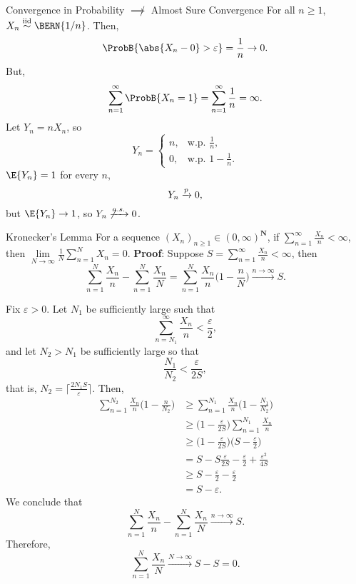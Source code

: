 \begin{Example}{Convergence in Probability $\not\implies$ Almost Sure Convergence}{}
    For all $ n\ge 1 $, $ X_n\iid \BERN{1/n} $.
    Then,
    \[ \ProbB{\abs{X_n-0}>\varepsilon}=\frac{1}{n}\to 0. \]
    But,
    \[ \sum_{n=1}^{\infty}\ProbB{X_n=1}=\sum_{n=1}^{\infty}\frac{1}{n}=\infty. \]
    Let $ Y_n=n X_n $, so
    \[ Y_n=\begin{cases}
            n, & \text{w.p. }\frac{1}{n},   \\
            0, & \text{w.p. }1-\frac{1}{n}.
        \end{cases} \]
    $ \E{Y_n}=1 $ for every $ n $,
    \[ Y_n\xrightarrow[]{p} 0, \]
    but $ \E{Y_n}\to 1 $, so $ Y_n\not\xrightarrow[]{a.s.} 0 $.
\end{Example}
\begin{Lemma}{Kronecker's Lemma}{}
    For a sequence $ (X_n)_{n\ge 1}\in (0,\infty)^{\mathbf{N}} $,
    if
    $ \sum_{n=1}^{\infty}\frac{X_n}{n}<\infty $,
    then
    $ \lim\limits_{{N} \to {\infty}}\frac{1}{N}\sum_{n=1}^{N}X_n=0 $.
    \tcblower{}
    \textbf{Proof}: Suppose
    $ S=\sum_{n=1}^{\infty}\frac{X_n}{n}<\infty $, then
    \[ \sum_{n=1}^{N}\frac{X_n}{n}-\sum_{n=1}^{N}\frac{X_n}{N}
        =\sum_{n=1}^{N}\frac{X_n}{n}\biggl(1-\frac{n}{N}\biggr)\xrightarrow[]{n\to\infty}S. \]

    Fix $ \varepsilon>0 $. Let $ N_1 $ be sufficiently large such that
    \[ \sum_{n=N_1}^{\infty}\frac{X_n}{n}<\frac{\varepsilon}{2}, \]
    and let $ N_2>N_1 $ be sufficiently large so that
    \[ \frac{N_1}{N_2}<\frac{\varepsilon}{2S}, \]
    that is, $ N_2=\lceil \frac{2N_1S}{\varepsilon}\rceil $.
    Then,
    \begin{align*}
        \sum_{n=1}^{N_2}\frac{X_n}{n}\biggl(1-\frac{n}{N_2}\biggr)
         & \ge \sum_{n=1}^{N_1}\frac{X_n}{n}\biggl(1-\frac{N_1}{N_2}\biggr)                \\
         & \ge \biggl(1-\frac{\varepsilon}{2S}\biggr)\sum_{n=1}^{N_1}\frac{X_n}{n}         \\
         & \ge \biggl(1-\frac{\varepsilon}{2S}\biggr)\biggl(S-\frac{\varepsilon}{2}\biggr) \\
         & =S-S \frac{\varepsilon}{2S}-\frac{\varepsilon}{2}+\frac{\varepsilon^2}{4S}      \\
         & \ge S-\frac{\varepsilon}{2}-\frac{\varepsilon}{2}                               \\
         & =S-\varepsilon.
    \end{align*}
    We conclude that
    \[ \sum_{n=1}^{N}\frac{X_n}{n}-\sum_{n=1}^{N}\frac{X_n}{N}\xrightarrow[]{n\to\infty}S. \]
    Therefore,
    \[ \sum_{n=1}^{N}\frac{X_n}{N}\xrightarrow[]{N\to\infty} S-S=0. \]
\end{Lemma}
